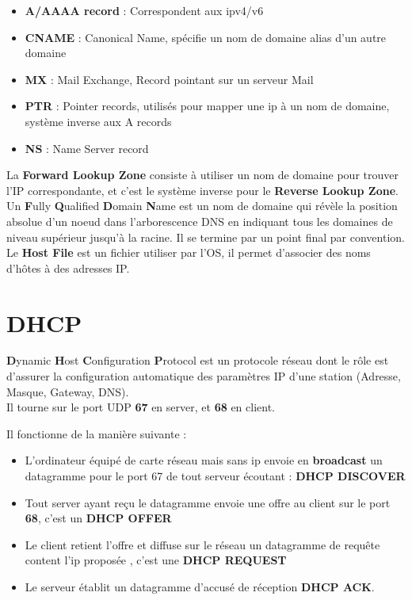\documentclass{report}
\begin{document}
		\begin{itemize}
			\item \textbf{A/AAAA record} : Correspondent aux ipv4/v6
			\item \textbf{CNAME} : Canonical Name, spécifie un nom de domaine alias d'un autre domaine
			\item \textbf{MX} : Mail Exchange, Record pointant sur un serveur Mail
			\item \textbf{PTR} : Pointer records, utilisés pour mapper une ip à un nom de domaine, système inverse aux A records
			\item \textbf{NS} : Name Server record\\
		\end{itemize}

		La \textbf{Forward Lookup Zone} consiste à utiliser un nom de domaine pour trouver l'IP correspondante, et c'est le système inverse pour le \textbf{Reverse Lookup Zone}.\\

		Un \textbf{F}ully \textbf{Q}ualified \textbf{D}omain \textbf{N}ame est un nom de domaine qui révèle la position absolue d'un noeud dans l'arborescence DNS en indiquant tous les domaines de niveau supérieur jusqu'à la racine. Il se termine par un point final par convention.\\

		Le \textbf{Host File} est un fichier utiliser par l'OS, il permet d'associer des noms d'hôtes à des adresses IP.\\
 
	\section{DHCP}

		\textbf{D}ynamic \textbf{H}ost \textbf{C}onfiguration \textbf{P}rotocol est un protocole réseau dont le rôle est d'assurer la configuration automatique des paramètres IP d'une station (Adresse, Masque, Gateway, DNS).\\

		Il tourne sur le port UDP \textbf{67} en server, et \textbf{68} en client.

		Il fonctionne de la manière suivante : \\

		\begin{itemize}
			\item L'ordinateur équipé de carte réseau mais sans ip envoie en \textbf{broadcast} un datagramme pour le port 67 de tout serveur écoutant : \textbf{DHCP DISCOVER}
			\item Tout server ayant reçu le datagramme envoie une offre au client sur le port \textbf{68}, c'est un \textbf{DHCP OFFER}
			\item Le client retient l'offre et diffuse sur le réseau un datagramme de requête content l'ip proposée , c'est une \textbf{DHCP REQUEST} 
			\item Le serveur établit un datagramme d'accusé de réception \textbf{DHCP ACK}.\\
		\end{itemize}
\end{document}
